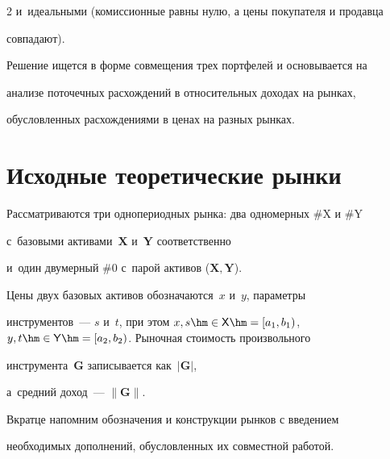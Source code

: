 \begin{multicols}{2}
и~идеальными (комиссионные равны нулю, а цены покупателя и продавца 


совпадают). 


  


  Решение ищется в форме совмещения трех портфелей и основывается на 


анализе поточечных расхождений в относительных доходах на рынках, 


обусловленных расхождениями в ценах на разных \mbox{рынках}. 





\vspace*{-6pt}


  


  \section{Исходные теоретические рынки}


  


  \vspace*{-2pt}


  


  Рассматриваются три однопериодных рынка: два одномерных \#X и \#Y 


  с~базовыми активами~$\boldsymbol{X}$ и~$\boldsymbol{Y}$ соответственно 


и~один двумерный \#0 с~парой активов ($\boldsymbol{X}, \boldsymbol{Y}$). 


Цены двух базовых активов обозначаются~$x$ и~$y$, параметры 


инструментов~--- $s$ и~$t$, при этом $x, s \hm\in {\sf X}\hm = [a_1, b_1)$, $y, t 


\hm\in {\sf Y}\hm = [a_2, b_2)$. Рыночная стоимость произвольного 


инструмента~$\boldsymbol{G}$ записывается как~$\vert\boldsymbol{G}\vert$, 


а~средний доход~--- $\|\boldsymbol{G}\|$.


  


  Вкратце напомним обозначения и конструкции рынков с введением 


необходимых дополнений, обусловленных их совместной работой. 


  



\end{multicols}
